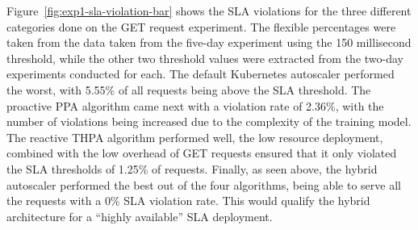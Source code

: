 \begin{center}
\begin{minipage}{\linewidth}
    \label{fig:exp1-sla-violation-bar}
\end{minipage}
\end{center}

Figure~\ref{fig:exp1-sla-violation-bar} shows the SLA violations for the three different categories done on the GET request experiment. The flexible percentages were taken from the data taken from the five-day experiment using the 150 millisecond threshold, while the other two threshold values were extracted from the two-day experiments conducted for each. The default Kubernetes autoscaler performed the worst, with 5.55\% of all requests being above the SLA threshold. The proactive PPA algorithm came next with a violation rate of 2.36\%, with the number of violations being increased due to the complexity of the training model. The reactive THPA algorithm performed well, the low resource deployment, combined with the low overhead of GET requests ensured that it only violated the SLA thresholds of 1.25\% of requests. Finally, as seen above, the hybrid autoscaler performed the best out of the four algorithms, being able to serve all the requests with a 0\% SLA violation rate. This would qualify the hybrid architecture for a ``highly available'' SLA deployment.\par

